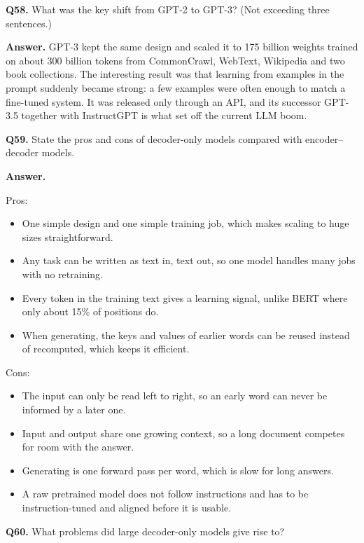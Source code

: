 \documentclass[11pt]{article}
\begin{document}
\medskip
\textbf{Q58.} What was the key shift from GPT-2 to GPT-3? (Not exceeding three sentences.)

\textbf{Answer.} GPT-3 kept the same design and scaled it to 175 billion weights trained on
about 300 billion tokens from CommonCrawl, WebText, Wikipedia and two book collections. The
interesting result was that learning from examples in the prompt suddenly became strong: a few
examples were often enough to match a fine-tuned system. It was released only through an API,
and its successor GPT-3.5 together with InstructGPT is what set off the current LLM boom.

\medskip
\textbf{Q59.} State the pros and cons of decoder-only models compared with encoder--decoder
models.

\textbf{Answer.}

Pros:
\begin{itemize}
  \item One simple design and one simple training job, which makes scaling to huge sizes straightforward.
  \item Any task can be written as text in, text out, so one model handles many jobs with no retraining.
  \item Every token in the training text gives a learning signal, unlike BERT where only about 15\% of positions do.
  \item When generating, the keys and values of earlier words can be reused instead of recomputed, which keeps it efficient.
\end{itemize}

Cons:
\begin{itemize}
  \item The input can only be read left to right, so an early word can never be informed by a later one.
  \item Input and output share one growing context, so a long document competes for room with the answer.
  \item Generating is one forward pass per word, which is slow for long answers.
  \item A raw pretrained model does not follow instructions and has to be instruction-tuned and aligned before it is usable.
\end{itemize}

\medskip
\textbf{Q60.} What problems did large decoder-only models give rise to?
\end{document}
